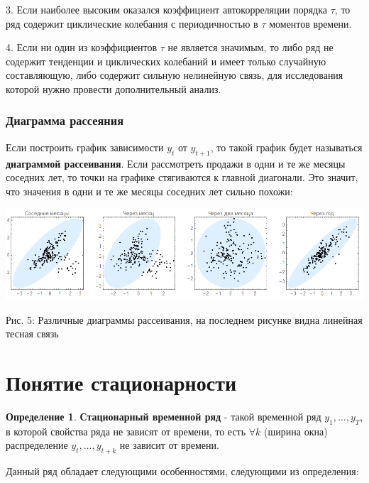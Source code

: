 \documentclass[aps,%
12pt,%
final,%
oneside,
onecolumn,%
musixtex, %
superscriptaddress,%
centertags]{article} %
\theoremstyle{plain}
\theoremstyle{definition}
\newtheorem{definition}{Определение}[subsection]
\theoremstyle{remark}
\begin{document}
3. Если наиболее высоким оказался коэффициент автокорреляции порядка $\tau$, то ряд содержит циклические колебания с периодичностью в $\tau$ моментов времени.

4. Если ни один из коэффициентов $\tau$ не является значимым, то либо ряд не содержит тенденции и циклических колебаний и имеет только случайную составляющую, либо содержит сильную нелинейную связь, для исследования которой нужно провести дополнительный анализ.

\subsubsection{Диаграмма рассеяния}

Если построить график зависимости $y_t$ от $y_{t+1}$, то такой график будет называться \textbf{диаграммой рассеивания}. Если рассмотреть продажи в одни и те же месяцы соседних лет, то точки на графике стягиваются к главной диагонали. Это значит, что значения в одни и те же месяцы соседних лет сильно похожи:

\begin{center}
	\includegraphics[scale=0.33]{images/5.png}

	Рис. 5: Различные диаграммы рассеивания, на последнем рисунке видна линейная тесная связь
\end{center}


\newpage
\section{Понятие стационарности}

\begin{definition}
	\textbf{Стационарный временной ряд} - такой временной ряд $y_1,\ldots, y_T$, в которой свойства ряда не зависят от времени, то есть $\forall k$ (ширина окна) распределение $y_t,\ldots,y_{t+k}$ не зависит от времени.
\end{definition}

Данный ряд обладает следующими особенностями, следующими из определения:
\end{document}
